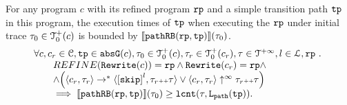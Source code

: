 \begin{lemma}
  For any program $c$ with its refined program $\mathtt{rp}$ and a simple transition path $\mathtt{tp}$ in this program,
  the execution times of $\mathtt{tp}$ when executing the $\mathtt{rp}$ under initial trace $\mathtt{\tau}_0 \in \mathcal{T}^{+}_0(c)$ is bounded by $\llbracket \mathtt{pathRB}(\mathtt{rp}, \mathtt{tp}) \rrbracket(\mathtt{\tau}_0)$.
  \[
    \begin{array}{l}
      \forall c, c_r \in \cdom, \tpath \in \absG(c), \trace_0 \in \ftdom_0(c),  \trace_r \in \ftdom_0(c_r), \trace \in \tdom, l \in \ldom, \rprog \st 
      \\ \qquad
      REFINE(\algrewrite(c)) = \rprog
      \land 
      \algrewrite(c_r) = \rprog
      \land
      \\ \qquad
      \land 
      \Big(
        \config{c_r, \trace_r} \rightarrow^* \config{\clabel{\eskip}^{l}, \trace_r \tracecat \trace}
        \lor \config{c_r, \trace_r} \uparrow^{\infty} \trace_r \tracecat \trace 
        \Big)
    \\ \qquad
    \implies
    \econfig{\inoutB(\rprog, \tpath)}(\trace_0) \geq \lcounter(\trace, \pathl(\tpath)).
    \end{array}
  \]
\end{lemma}
%
